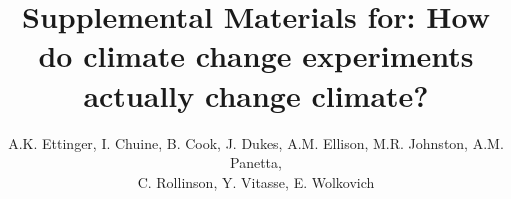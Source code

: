\documentclass{article}
\begin{document}
 
\title{Supplemental Materials for: How do climate change experiments actually change climate?} %

\author{A.K. Ettinger, I. Chuine, B. Cook, J. Dukes, A.M. Ellison, M.R. Johnston, A.M. Panetta,\\ C. Rollinson, Y. Vitasse, E. Wolkovich}
\maketitle  %
\renewcommand{\thetable}{S\arabic{table}}
\renewcommand{\thefigure}{S\arabic{figure}}
\end{document}
